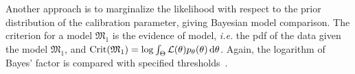 \documentclass[../../Main_ManuscritThese.tex]{subfiles}
\begin{document}
Another approach is to marginalize the likelihood with respect to the prior distribution of the calibration parameter, giving Bayesian model comparison. The criterion for a model $\mathfrak{M}_1$ is the evidence of model, \emph{i.e.} the pdf of the data given the model $\mathfrak{M}_1$, and $\mathrm{Crit}(\mathfrak{M}_1) = \log \int_\Theta \mathcal{L}(\theta) p_\theta(\theta)\,\mathrm{d}\theta$.
Again, the logarithm of Bayes' factor is compared with specified thresholds~\cite{kass_bayes_1995,burnham_multimodel_2004}.
\end{document}
